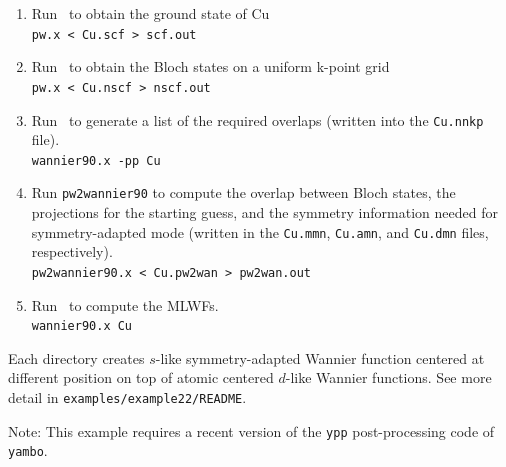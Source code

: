 \documentclass[a4paper,11pt,twoside]{article}
\begin{document}
\begin{enumerate}
\item Run \pwscf\ to obtain the ground state of Cu\\
{\tt pw.x < Cu.scf > scf.out}

\item Run \pwscf\ to obtain the Bloch states on a uniform k-point grid\\
{\tt pw.x < Cu.nscf > nscf.out}

\item Run \wannier\ to generate a list of the required overlaps (written
  into the {\tt Cu.nnkp} file).\\ 
{\tt wannier90.x -pp Cu}

\item Run {\tt pw2wannier90} to compute the overlap between Bloch
  states, the projections for the starting guess, and the symmetry information needed for symmetry-adapted mode (written in the
  {\tt Cu.mmn}, {\tt Cu.amn}, and {\tt Cu.dmn} files, respectively).\\  
{\tt pw2wannier90.x < Cu.pw2wan > pw2wan.out}

\item Run \wannier\ to compute the MLWFs.\\
{\tt wannier90.x Cu}
\end{enumerate}

Each directory creates $s$-like symmetry-adapted Wannier function centered at different position on top of atomic centered $d$-like Wannier functions. 
See more detail in {\tt examples/example22/README}. 



Note: This example requires a recent version of the {\tt ypp} post-processing code of {\tt yambo}.
\end{document}
